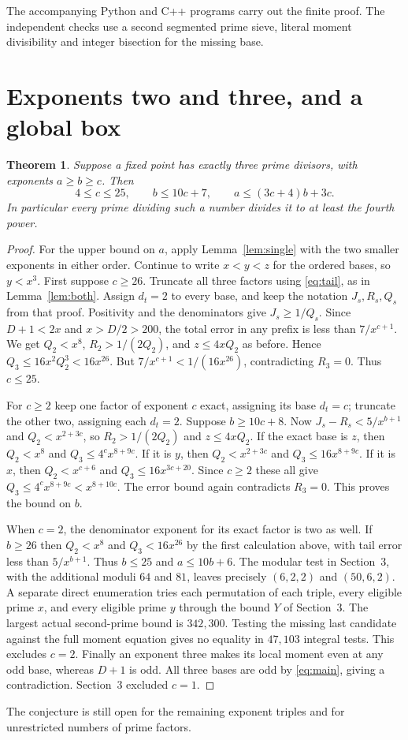 \documentclass[11pt]{article}
\newtheorem{theorem}{Theorem}
\begin{document}
The accompanying Python and C++ programs carry out the finite proof.
The independent checks use a second segmented prime sieve, literal
moment divisibility and integer bisection for the missing base.
\section{Exponents two and three, and a global box}
\begin{theorem}
Suppose a fixed point has exactly three prime divisors, with exponents
$a\ge b\ge c$. Then
\[
 4\le c\le25,\qquad b\le10c+7,\qquad a\le(3c+4)b+3c.
\]
In particular every prime dividing such a number divides it to at
least the fourth power.
\end{theorem}
\begin{proof}
For the upper bound on $a$, apply Lemma~\ref{lem:single} with the two
smaller exponents in either order. Continue to write $x<y<z$ for the
ordered bases, so $y<x^3$. First suppose $c\ge26$.
Truncate all three factors using \eqref{eq:tail}, as in
Lemma~\ref{lem:both}. Assign $d_t=2$ to every base, and keep the
notation $J_s,R_s,Q_s$ from that proof. Positivity and the denominators
give $J_s\ge1/Q_s$. Since $D+1<2x$ and $x>D/2>200$, the total error
in any prefix is less than $7/x^{c+1}$. We get $Q_2<x^8$,
$R_2>1/(2Q_2)$, and $z\le4xQ_2$ as before. Hence
$Q_3\le16x^2Q_2^3<16x^{26}$. But $7/x^{c+1}<1/(16x^{26})$,
contradicting $R_3=0$. Thus $c\le25$.

For $c\ge2$ keep one factor of exponent $c$ exact, assigning
its base $d_t=c$; truncate the other two, assigning each $d_t=2$.
Suppose $b\ge10c+8$. Now $J_s-R_s<5/x^{b+1}$ and
$Q_2<x^{2+3c}$, so $R_2>1/(2Q_2)$ and $z\le4xQ_2$.
If the exact base is $z$, then $Q_2<x^8$ and
$Q_3\le4^c x^{8+9c}$. If it is $y$, then
$Q_2<x^{2+3c}$ and $Q_3\le16x^{8+9c}$. If it is $x$,
then $Q_2<x^{c+6}$ and $Q_3\le16x^{3c+20}$.
Since $c\ge2$ these all give $Q_3\le4^c x^{8+9c}<x^{8+10c}$.
The error bound again contradicts $R_3=0$. This proves the bound on $b$.

When $c=2$, the denominator exponent for its exact factor is two
as well. If $b\ge26$ then $Q_2<x^8$ and $Q_3<16x^{26}$ by the
first calculation above, with tail error less than $5/x^{b+1}$.
Thus $b\le25$ and $a\le10b+6$. The modular test in Section~3,
with the additional moduli $64$ and $81$, leaves precisely
$(6,2,2)$ and $(50,6,2)$. A separate direct enumeration tries each
permutation of each triple, every eligible prime $x$, and every eligible
prime $y$ through the bound $Y$ of Section~3. The largest actual
second-prime bound is $342{,}300$. Testing the missing last candidate
against the full moment equation gives no equality in $47{,}103$
integral tests. This excludes $c=2$. Finally an exponent three
makes its local moment even at any odd base, whereas $D+1$ is odd.
All three bases are odd by \eqref{eq:main}, giving a contradiction.
Section~3 excluded $c=1$.
\end{proof}
The conjecture is still open for the remaining exponent triples and
for unrestricted numbers of prime factors.
\end{document}
